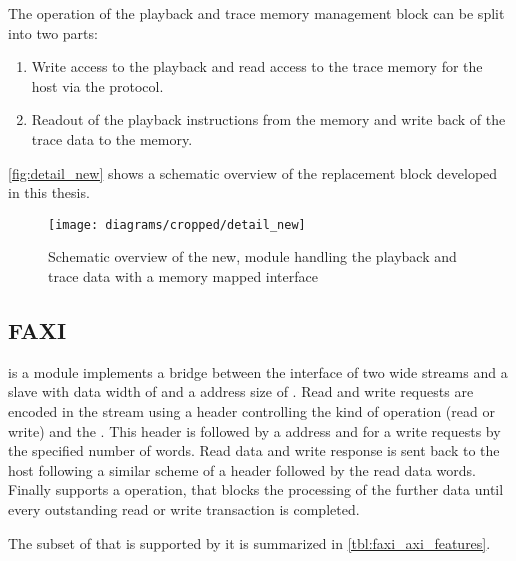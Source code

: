 The operation of the playback and trace memory management block can be split into two parts:
\begin{enumerate}
  \item Write access to the playback and read access to the trace memory for the host via the \HostARQ{} protocol.
  \item Readout of the playback instructions from the memory and write back of the trace data to the memory.
\end{enumerate}

\autoref{fig:detail_new} shows a schematic overview of the replacement block developed in this thesis.
\begin{figure}[htbp]
\centerline{\texttt{[image: diagrams/cropped/detail\_new]}}
\caption{Schematic overview of the new, module handling the playback and trace data with a memory mapped interface}\label{fig:detail_new}
\end{figure}

\subsection{FAXI}
\FAXI{} is a \FPGA{} module implements a bridge between the \HostARQ{} \FPGA{} interface of two \PhyWordSize{} wide streams and a \AXI{} slave with data width of \PhyWordSize{} and a address size of \PhyWordSize{}.
Read and write requests are encoded in the \HostARQ{} stream using a \PhyWordSize{} header controlling the kind of operation (read or write) and the \burstsize{}. This header is followed by a \PhyWordSize{} address and for a write requests by the specified number of \PhyWordSize{} words.
Read data and write response is sent back to the host following a similar scheme of a \PhyWordSize{} header followed by the read data words.
Finally \FAXI{} supports a \globalfence{} operation, that blocks the processing of the further data until every outstanding read or write transaction is completed.

The subset of \AXI{} that is supported by it is summarized in \autoref{tbl:faxi_axi_features}.

